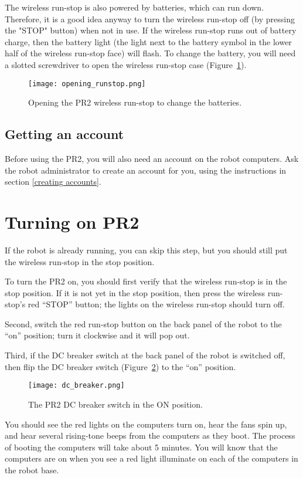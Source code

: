 The wireless run-stop is also powered by batteries, which can run down.
Therefore, it is a good idea anyway to turn the wireless run-stop off (by pressing the "STOP" button) when not in use.
If the wireless run-stop runs out of battery charge, then the battery light
(the light next to the battery symbol in the lower half of the wireless run-stop face)
will flash. To change the battery, you will need a slotted screwdriver to open
the wireless run-stop case (Figure~\ref{fig:opening-runstop}).

\begin{figure}[!h]
\centering
\texttt{[image: opening\_runstop.png]}
\caption{Opening the PR2 wireless run-stop to change the batteries.}
\label{fig:opening-runstop}
\end{figure}

\subsection{Getting an account}
Before using the PR2, you will also need an account on the robot computers. Ask the robot administrator to create an account for you, using the instructions 
in section \ref{creating accounts}.
\section{Turning on PR2}
If the robot is already running, you can skip this step, but you should still put the wireless run-stop in the stop position. 

To turn the PR2 on, you should first verify that the wireless run-stop is in the stop position. If it is not yet in the stop position, then press the wireless run-stop's red ``STOP'' button; the lights on the wireless run-stop should turn off. 

Second, switch the red run-stop button on the back panel of the robot to the ``on'' position; turn it clockwise and it will pop out.

Third, if the DC breaker switch at the back panel of the robot is switched off, then flip the DC breaker switch (Figure~\ref{fig:dc_breaker}) to the ``on'' position.

\begin{figure}[h]
\centering
\texttt{[image: dc\_breaker.png]}
\caption{The PR2 DC breaker switch in the ON position.}
\label{fig:dc_breaker}
\end{figure}

You should see the red lights on the computers turn on, hear the fans spin up, and hear several rising-tone beeps from the computers 
as they boot.  The process of booting the computers will take about 5 minutes.  You will know that the computers are on when you see a red light illuminate on each of the computers in the robot base.  
